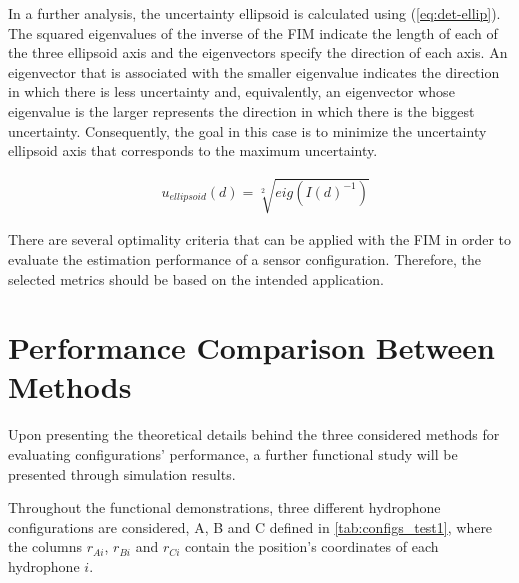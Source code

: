 In a further analysis, the uncertainty ellipsoid is calculated using (\ref{eq:det-ellip}). The squared eigenvalues of the inverse of the FIM indicate the length of each of the three ellipsoid axis and the eigenvectors specify the direction of each axis. An eigenvector that is associated with the smaller eigenvalue indicates the direction in which there is less uncertainty and, equivalently, an eigenvector whose eigenvalue is the larger represents the direction in which there is the biggest uncertainty. Consequently, the goal in this case is to minimize the uncertainty ellipsoid axis that corresponds to the maximum uncertainty.

\begin{eqnarray}
	& u_{ellipsoid}(d) = \sqrt[2]{eig(I(d)^{-1})}
	\label{eq:det-ellip}
\end{eqnarray}

There are several optimality criteria that can be applied with the FIM in order to evaluate the estimation performance of a sensor configuration. Therefore, the selected metrics should be based on the intended application.

\section{Performance Comparison Between Methods} \label{subsec:perform-compar-meth}

Upon presenting the theoretical details behind the three considered methods for evaluating configurations' performance, a further functional study will be presented through simulation results. 

Throughout the functional demonstrations, three different hydrophone configurations are considered, A, B and C defined in \ref{tab:configs_test1}, where the columns $r_{Ai}$, $r_{Bi}$ and $r_{Ci}$ contain the position's coordinates of each hydrophone $i$.


